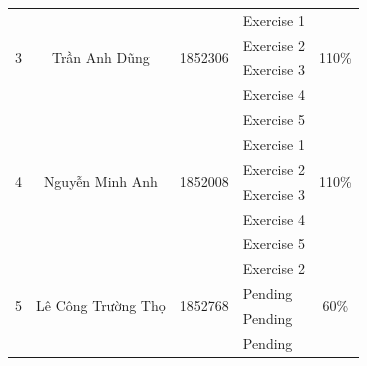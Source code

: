 \documentclass[a4paper]{article}
\numberwithin{equation}{section}
\begin{document}
\begin{center}
\begin{tabular}{|c|c|c|l|c|}
    \hline
    \multirow{4}{*}{3} & \multirow{4}{*}{Trần Anh Dũng}      & \multirow{4}{*}{1852306} & \textendash{} Exercise 1    & \multirow{4}{*}{110\%}      \\
                       &                                        &                          & \textendash{} Exercise 2          &                             \\
                       &                                        &                          & \textendash{} Exercise 3       &                             \\
                       &                                        &                          & \textendash{} Exercise 4          &                             \\
                       &                                        &                          & \textendash{} Exercise 5    &                             \\
    \hline
    \multirow{4}{*}{4} & \multirow{4}{*}{Nguyễn Minh Anh}     & \multirow{4}{*}{1852008} & \textendash{} Exercise 1    & \multirow{4}{*}{110\%}      \\
                       &                                        &                          & \textendash{} Exercise 2    &                             \\
                       &                                        &                          & \textendash{} Exercise 3          &                             \\
                       &                                        &                          & \textendash{} Exercise 4         &                             \\
                       &                                        &                          & \textendash{} Exercise 5    &                             \\
    \hline
    \multirow{4}{*}{5} & \multirow{4}{*}{Lê Công Trường Thọ}          & \multirow{4}{*}{1852768} & \textendash{} Exercise 2    & \multirow{4}{*}{60\%}      \\
                       &                                        &                          & \textendash{} Pending          &                             \\
                       &                                        &                          & \textendash{} Pending       &                             \\
                       &                                        &                          & \textendash{} Pending          &                             \\
    \hline
  \end{tabular}
\end{center}
\end{document}
